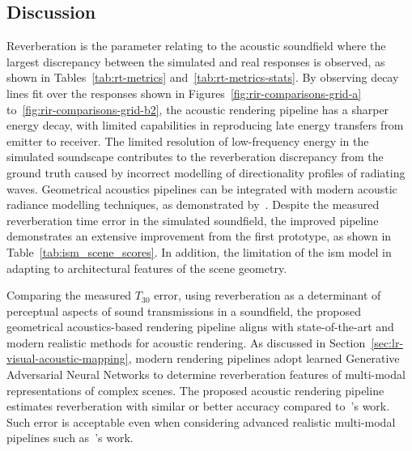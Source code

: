 \subsection{Discussion}
Reverberation is the parameter relating to the acoustic soundfield where the largest discrepancy between the simulated and real responses is observed, as shown in Tables~\ref{tab:rt-metrics} and~\ref{tab:rt-metrics-stats}. By observing decay lines fit over the responses shown in Figures~\ref{fig:rir-comparisons-grid-a} to~\ref{fig:rir-comparisons-grid-b2}, the acoustic rendering pipeline has a sharper energy decay, with limited capabilities in reproducing late energy transfers from emitter to receiver. The limited resolution of low-frequency energy in the simulated soundscape contributes to the reverberation discrepancy from the ground truth caused by incorrect modelling of directionality profiles of radiating waves. Geometrical acoustics pipelines can be integrated with modern acoustic radiance modelling techniques, as demonstrated by~\cite{siltanen2010room}. Despite the measured reverberation time error in the simulated soundfield, the improved pipeline demonstrates an extensive improvement from the first prototype, as shown in Table~\ref{tab:ism_scene_scores}. In addition, the limitation of the \acrshort{ism} model in adapting to architectural features of the scene geometry. \par
Comparing the measured $T_{30}$ error, using reverberation as a determinant of perceptual aspects of sound transmissions in a soundfield, the proposed geometrical acoustics-based rendering pipeline aligns with state-of-the-art and modern realistic methods for acoustic rendering. As discussed in Section~\ref{sec:lr-visual-acoustic-mapping}, modern rendering pipelines adopt learned Generative Adversarial Neural Networks to determine reverberation features of multi-modal representations of complex scenes. The proposed acoustic rendering pipeline estimates reverberation with similar or better accuracy compared to~\cite{Singh_2021_ICCV}'s work. Such error is acceptable even when considering advanced realistic multi-modal pipelines such as~\cite{schissler2014high}'s work.\par

